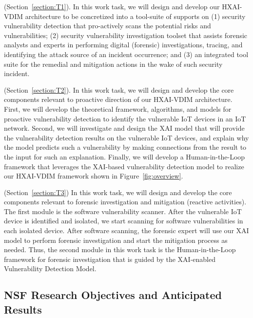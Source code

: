  (Section~\ref{section:T1}). In this work task, we will design and develop our HXAI-VDIM architecture to be concretized into a tool-suite of supports on (1) security vulnerability detection that pro-actively scans the potential risks and vulnerabilities; (2) security vulnerability investigation toolset that assists forensic analysts and experts in performing digital (forensic) investigations, tracing, and identifying the attack source of an incident occurrence; and (3) an integrated tool suite for the remedial and mitigation actions in the wake of such security incident.


 (Section~\ref{section:T2}). In this work task, we will design and develop the core components relevant to proactive direction of our HXAI-VDIM architecture. First, we will develop the theoretical framework,
algorithms, and models for proactive vulnerability detection to identify the vulnerable IoT devices in an IoT network. Second, we will investigate and design the XAI model that will provide the vulnerability detection results on the vulnerable IoT devices, and explain why the model predicts such a vulnerability by making connections from the result to the input for such an explanation. Finally, we will develop a Human-in-the-Loop framework that leverages the XAI-based vulnerability detection model to realize our HXAI-VDIM framework shown in Figure~\ref{fig:overview}.  

 (Section~\ref{section:T3}) In this work task, we will design and develop the core components relevant to forensic investigation and mitigation (reactive activities). The first module is the software vulnerability scanner. After the vulnerable IoT device is identified and isolated, we start scanning for software vulnerabilities in each isolated device. After software scanning, the forensic expert will use our XAI model to perform forensic investigation and start the mitigation process as needed. Thus, the second module in this work task is the Human-in-the-Loop framework for forensic investigation that is guided by the XAI-enabled Vulnerability Detection Model.

\subsection{NSF Research Objectives and Anticipated Results}

